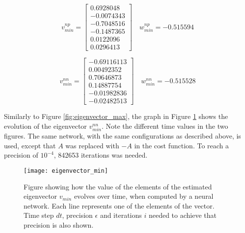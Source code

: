 \begin{equation*}
  v_{min}^{np} = \begin{bmatrix}
   0.6928048 \\
  -0.0074343 \\
  -0.7048516 \\
  -0.1487365 \\
  0.0122096 \\
  0.0296413
  \end{bmatrix} \quad w_{min}^{np} = -0.515594
\end{equation*}

\begin{equation*}
  v_{min}^{nn} = \begin{bmatrix}
   -0.69116113  \\
   0.00492352  \\
   0.70646873  \\
   0.14887754 \\
   -0.01982836 \\
   -0.02482513
  \end{bmatrix} \quad w_{min}^{nn} = -0.515528
\end{equation*}

Similarly to Figure \ref{fig:eigenvector_max}, the graph in Figure \ref{fig:eigenvector_min} shows the evolution of the eigenvector $v_{min}^{nn}$. Note the different time values in the two figures. The same network, with the same configurations as described above, is used, except that $A$ was replaced with $-A$ in the cost function. To reach a precision of $10^{-4}$, 842653 iterations was needed. 

\begin{figure}[htbp]
 \centering
 \texttt{[image: eigenvector\_min]}
 \caption{Figure showing how the value of the elements of the estimated eigenvector $v_{min}$ evolves over time, when computed by a neural network. Each line represents one of the elements of the vector. Time step $dt$, precision $\epsilon$ and iterations $i$ needed to achieve that precision is also shown.}
 \label{fig:eigenvector_min}
\end{figure}

